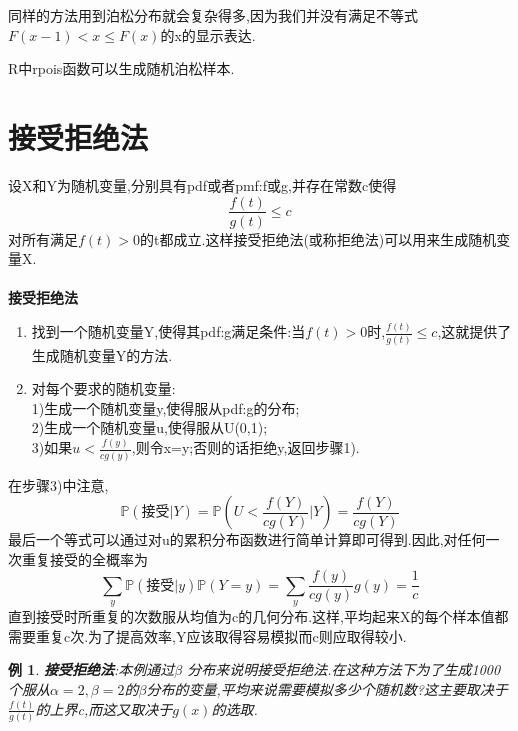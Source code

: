 \documentclass[11pt,a4paper,oneside]{book}
\newtheorem{example}{例}
\begin{document}
同样的方法用到泊松分布就会复杂得多,因为我们并没有满足不等式$ F(x-1)<x\leq F(x) $的x的显示表达.

R中rpois函数可以生成随机泊松样本.

\section{接受拒绝法}
设X和Y为随机变量,分别具有pdf或者pmf:f或g,并存在常数c使得
\begin{equation}
	\frac{f(t)}{g(t)}\leq c
\end{equation}
对所有满足$ f(t)>0 $的t都成立.这样接受拒绝法(或称拒绝法)可以用来生成随机变量X.\\
\\
\textbf{接受拒绝法}
\begin{enumerate}
	\item 找到一个随机变量Y,使得其pdf:g满足条件:当$ f(t)>0 $时,$ \frac{f(t)}{g(t)}\leq c $,这就提供了生成随机变量Y的方法.
	\item 对每个要求的随机变量:\\
	1)生成一个随机变量y,使得服从pdf:g的分布;\\
	2)生成一个随机变量u,使得服从U(0,1);\\
	3)如果$ u<\frac{f(y)}{cg(y)} $,则令x=y;否则的话拒绝y,返回步骤1).
\end{enumerate}

在步骤3)中注意,
\begin{equation}
\mathbb{P}(\mbox{接受}|Y)=\mathbb{P}(U<\frac{f(Y)}{cg(Y)}|Y)=\frac{f(Y)}{cg(Y)}
\end{equation}
最后一个等式可以通过对u的累积分布函数进行简单计算即可得到.因此,对任何一次重复接受的全概率为
\begin{equation}
\sum_{y}\mathbb{P}(\mbox{接受}|y)\mathbb{P}(Y=y)=\sum_{y}\frac{f(y)}{cg(y)}g(y)=\frac{1}{c}
\end{equation}
直到接受时所重复的次数服从均值为c的几何分布.这样,平均起来X的每个样本值都需要重复c次.为了提高效率,Y应该取得容易模拟而c则应取得较小.

\begin{example}
\textbf{接受拒绝法}:本例通过$ \beta $ 分布来说明接受拒绝法.在这种方法下为了生成1000个服从$ \alpha=2,\beta=2 $的$ \beta $分布的变量,平均来说需要模拟多少个随机数?这主要取决于$ \frac{f(t)}{g(t)} $的上界c,而这又取决于$ g(x) $的选取.
\end{example}
\end{document}
